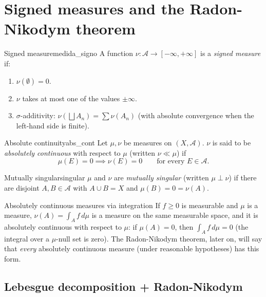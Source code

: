 \documentclass[11pt, a4paper]{article}
\begin{document}
\newpage

\section{Signed measures and the Radon-Nikodym theorem}

\begin{definicion}{Signed measure}{medida_signo}
A function $\nu: \mathcal{A} \to [-\infty, +\infty]$ is a \emph{signed measure} if:
\begin{enumerate}
    \item $\nu(\emptyset) = 0$.
    \item $\nu$ takes at most one of the values $\pm\infty$.
    \item $\sigma$-additivity: $\nu(\bigsqcup A_n) = \sum \nu(A_n)$ (with absolute convergence
    when
    the left-hand side is finite).
\end{enumerate}
\end{definicion}

\begin{definicion}{Absolute continuity}{abs_cont}
Let $\mu, \nu$ be measures on $(X, \mathcal{A})$. $\nu$ is said to be \emph{absolutely continuous}
with respect to $\mu$ (written $\nu \ll \mu$) if
$$ \mu(E) = 0 \implies \nu(E) = 0 \qquad \text{for every } E \in \mathcal{A}. $$
\end{definicion}

\begin{definicion}{Mutually singular}{singular}
$\mu$ and $\nu$ are \emph{mutually singular} (written $\mu \perp \nu$) if there are
disjoint $A, B \in \mathcal{A}$ with $A \cup B = X$ and $\mu(B) = 0 = \nu(A)$.
\end{definicion}

\begin{ejemplo}{Absolutely continuous measures via integration}{}
If $f \ge 0$ is measurable and $\mu$ is a measure, $\nu(A) = \int_A f \, d\mu$ is a measure on the
same measurable space, and it is absolutely continuous with respect to $\mu$: if $\mu(A) = 0$, then
$\int_A f \, d\mu = 0$ (the integral over a $\mu$-null set is zero). The
Radon-Nikodym theorem, later on, will say that \emph{every} absolutely continuous measure (under
reasonable hypotheses) has this form.
\end{ejemplo}

\subsection{Lebesgue decomposition + Radon-Nikodym}
\end{document}
